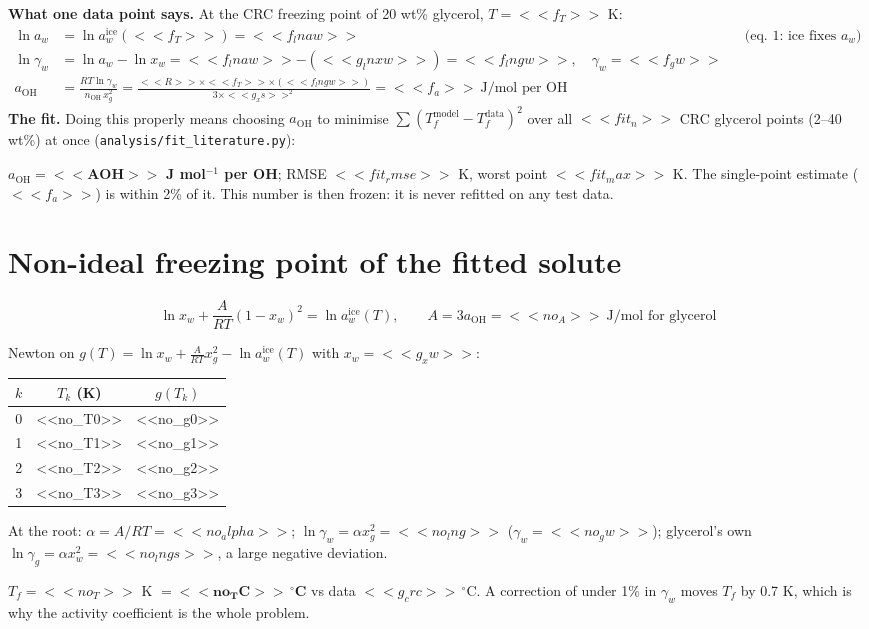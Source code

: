 \documentclass[11pt,a4paper]{article}
\newcommand{\aoh}{a_{\mathrm{OH}}}
\newcommand{\file}[1]{\texttt{\small #1}}
\newcommand{\aice}{\ln a_w^{\mathrm{ice}}}
\begin{document}
\textbf{What one data point says.} At the CRC freezing point of 20 wt\% glycerol, $T=<<f_T>>$ K:
\begin{align*}
\ln a_w &= \aice(<<f_T>>)=<<f_lnaw>> &&\text{(eq.~1: ice fixes $a_w$)}\\
\ln\gamma_w &= \ln a_w-\ln x_w=<<f_lnaw>>-(<<g_lnxw>>)=<<f_lngw>>,\quad \gamma_w=<<f_gw>>\\
\aoh &= \frac{RT\ln\gamma_w}{n_\mathrm{OH}\,x_g^2}=\frac{<<R>>\times<<f_T>>\times(<<f_lngw>>)}{3\times<<g_xs>>^2}=<<f_a>>\ \text{J/mol per OH}
\end{align*}
\textbf{The fit.} Doing this properly means choosing $\aoh$ to minimise $\sum(T_f^{\text{model}}-T_f^{\text{data}})^2$ over all
$<<fit_n>>$ CRC glycerol points (2--40 wt\%) at once (\file{analysis/fit\_literature.py}):
\begin{result}
$\aoh=\mathbf{<<AOH>>}$ \textbf{J mol$^{-1}$ per OH}; RMSE $<<fit_rmse>>$ K, worst point $<<fit_max>>$ K. The single-point
estimate ($<<f_a>>$) is within 2\% of it. This number is then frozen: it is never refitted on any test data.
\end{result}

\section{Non-ideal freezing point of the fitted solute}
\begin{eqbox}
\[ \ln x_w+\frac{A}{RT}(1-x_w)^2=\aice(T),\qquad A=3\aoh=<<no_A>>\ \text{J/mol for glycerol}\tag{4}\]
\end{eqbox}
Newton on $g(T)=\ln x_w+\frac{A}{RT}x_g^2-\aice(T)$ with $x_w=<<g_xw>>$:
\begin{center}\small
\begin{tabular}{c c c}
\toprule
$k$ & $T_k$ (K) & $g(T_k)$\\
\midrule
0 & <<no_T0>> & <<no_g0>>\\
1 & <<no_T1>> & <<no_g1>>\\
2 & <<no_T2>> & <<no_g2>>\\
3 & <<no_T3>> & <<no_g3>>\\
\bottomrule
\end{tabular}
\end{center}
At the root: $\alpha=A/RT=<<no_alpha>>$; $\ln\gamma_w=\alpha x_g^2=<<no_lng>>$ ($\gamma_w=<<no_gw>>$);
glycerol's own $\ln\gamma_g=\alpha x_w^2=<<no_lngs>>$, a large negative deviation.
\begin{result}
$T_f=<<no_T>>$ K $=\mathbf{<<no_TC>>\,^\circ}$\textbf{C} vs data $<<g_crc>>\,^\circ$C. A correction of under 1\% in $\gamma_w$
moves $T_f$ by 0.7 K, which is why the activity coefficient is the whole problem.
\end{result}
\end{document}
